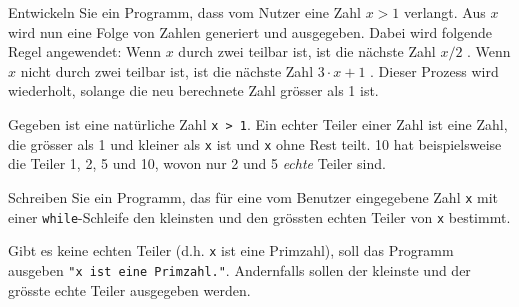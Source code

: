 \begin{myexercise}
	Entwickeln Sie ein Programm, dass vom Nutzer eine Zahl $x > 1$ verlangt. Aus $x$ wird nun eine Folge von Zahlen generiert und ausgegeben. Dabei wird folgende Regel angewendet: Wenn $x$ durch zwei teilbar ist, ist die nächste Zahl $x / 2$ . Wenn $x$ nicht durch zwei teilbar ist, ist die nächste Zahl $3 \cdot x + 1$ . Dieser Prozess wird wiederholt, solange die neu berechnete Zahl grösser als 1 ist.
	\begin{myanswer}
		
	\end{myanswer}
\end{myexercise}

% 		

\begin{myexercise}
	\label{K04:teiler}
	Gegeben ist eine natürliche Zahl \lstinline|x > 1|. Ein echter Teiler einer Zahl ist eine Zahl, die grösser als 1 und kleiner als \lstinline|x| ist und \lstinline|x| ohne Rest teilt. 10 hat beispielsweise die Teiler 1, 2, 5 und 10, wovon nur 2 und 5 \textit{echte} Teiler sind.

	Schreiben Sie ein Programm, das für eine vom Benutzer eingegebene Zahl \lstinline|x| mit einer \lstinline|while|-Schleife den kleinsten und den grössten echten Teiler von \lstinline|x| bestimmt.

	Gibt es keine echten Teiler (d.h. \lstinline|x| ist eine Primzahl), soll das Programm ausgeben \lstinline|"x ist eine Primzahl."|. Andernfalls sollen der kleinste und der grösste echte Teiler ausgegeben werden.

	\begin{myanswer}
		
	\end{myanswer}
\end{myexercise}

